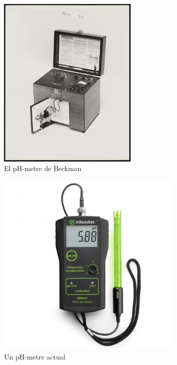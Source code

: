 \begin{minipage}[h]{0.5\textwidth}
  \begin{figure}[H]
  \centering
  \includegraphics[width=0.6\textwidth]{./Figures/modelbeckman.png}
  \caption{El pH-metre de Beckman~\cite{P2}}
  \label{fig:pH-metre}
  \end{figure}
\end{minipage}
\begin{minipage}[h]{0.5\textwidth}
  \begin{figure}[H]
  \centering
  \includegraphics[width=0.8\textwidth]{./Figures/pHmetre.png}
  \caption{Un pH-metre actual~\cite{P1}}
  \label{fig:pH-metre}
  \end{figure}
\end{minipage}

